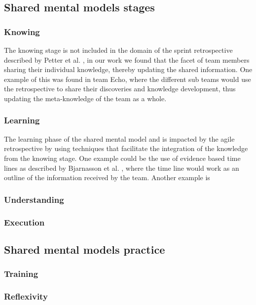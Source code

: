 \subsection{Shared mental models stages}

\subsubsection{Knowing}
The knowing stage is not included in the domain of the sprint retrospective described by Petter et al. \cite{Petter2013}, in our work we found that the facet of team members sharing their individual knowledge, thereby updating the shared information. One example of this was found in team Echo, where the different sub teams would use the retrospective to share their discoveries and knowledge development, thus updating the meta-knowledge of the team as a whole. 

\subsubsection{Learning}
The learning phase of the shared mental model and is impacted by the agile retrospective by using techniques that facilitate the integration of the knowledge from the knowing stage. One example could be the use of evidence based time lines as described by Bjarnasson et al. \cite{Bjarnason2012}, where the time line would work as an outline of the information received by the team. Another example is 

\subsubsection{Understanding}

\subsubsection{Execution}

\subsection{Shared mental models practice}

\subsubsection{Training}

\subsubsection{Reflexivity}
	
